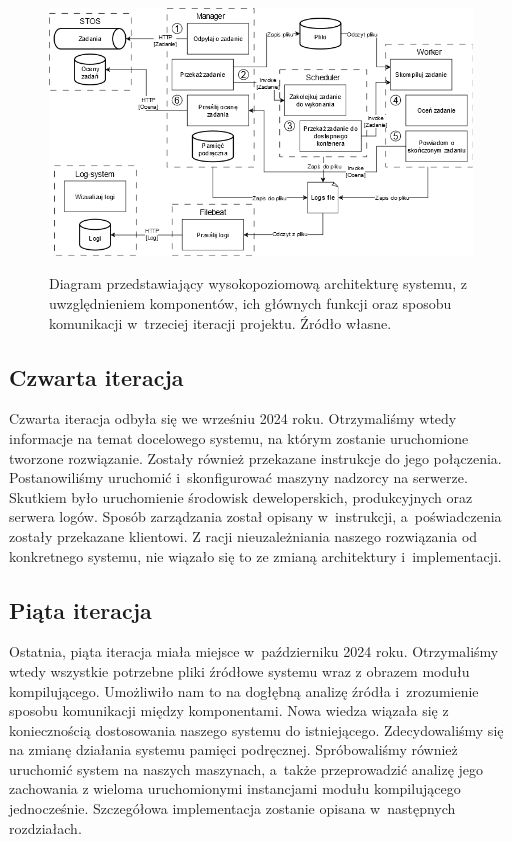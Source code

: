 \begin{figure}[!h]
	\begin{center}
		\resizebox{1.0\textwidth}{!} {
			\includegraphics{img/1/i3_arch.png}
		}
		\caption[Architektura po trzeciej iteracji]{Diagram przedstawiający wysokopoziomową architekturę systemu, z uwzględnieniem komponentów, ich głównych funkcji oraz sposobu komunikacji w~trzeciej iteracji projektu. Źródło własne.}
		\label{i3}
	\end{center}
\end{figure}

\subsection{Czwarta iteracja}
Czwarta iteracja odbyła się we wrześniu 2024 roku. Otrzymaliśmy wtedy informacje na temat docelowego systemu, na którym zostanie uruchomione tworzone rozwiązanie. Zostały również przekazane instrukcje do jego połączenia. Postanowiliśmy uruchomić i~skonfigurować maszyny nadzorcy na serwerze. Skutkiem było uruchomienie środowisk deweloperskich, produkcyjnych oraz serwera logów. Sposób zarządzania został opisany w~instrukcji, a~poświadczenia zostały przekazane klientowi. Z racji nieuzależniania naszego rozwiązania od konkretnego systemu, nie wiązało się to ze zmianą architektury i~implementacji. 

\subsection{Piąta iteracja}
Ostatnia, piąta iteracja miała miejsce w~październiku 2024 roku. Otrzymaliśmy wtedy wszystkie potrzebne pliki źródłowe systemu wraz z obrazem modułu kompilującego. Umożliwiło nam to na dogłębną analizę źródła i~zrozumienie sposobu komunikacji między komponentami. Nowa wiedza wiązała się z koniecznością dostosowania naszego systemu do istniejącego. Zdecydowaliśmy się na zmianę działania systemu pamięci podręcznej. Spróbowaliśmy również uruchomić system na naszych maszynach, a~także przeprowadzić analizę jego zachowania z wieloma uruchomionymi instancjami modułu kompilującego jednocześnie. Szczegółowa implementacja zostanie opisana w~następnych rozdziałach.